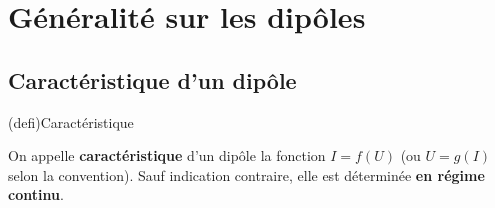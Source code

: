 \documentclass[../../main/main.tex]{subfiles}
\begin{document}
\vspace*{\fill}

\newpage

\section{Généralité sur les dipôles}
\subsection{Caractéristique d'un dipôle}
\begin{tcbraster}[raster columns=2, raster equal height=rows]
	\begin{tcb}[label=def:dipcara](defi){Caractéristique}

		On appelle \textbf{caractéristique} d'un dipôle la fonction $I = f(U)$
		(ou $U = g(I)$ selon la convention). Sauf indication contraire, elle est
		déterminée \textbf{en régime continu}.


\end{tcb}
\end{tcbraster}
\end{document}
